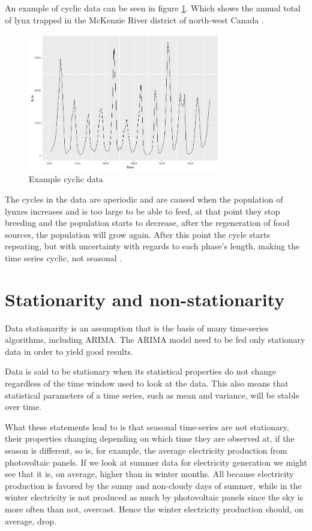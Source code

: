 \documentclass[12pt,a4paper,titlepage]{report}
\begin{document}
An example of cyclic data can be seen in figure \ref{dlynx}. Which shows the annual total of lynx trapped in the McKenzie River district of north-west Canada \cite{fpp2stationarity}.
\begin{figure}[h]
    \centering
    \includegraphics[width=0.75\textwidth]{dlynx}
    \caption{Example cyclic data}
    \label{dlynx}
\end{figure}

The cycles in the data are aperiodic and are caused when the population of lynxes increases and is too large to be able to feed, at that point they stop breeding and the population starts to decrease, after the regeneration of food sources, the population will grow again. After this point the cycle starts repeating, but with uncertainty with regards to each phase's length, making the time series cyclic, not seasonal \cite{fpp2stationarity}.

\section{Stationarity and non-stationarity} \label{stationaritysection}

Data stationarity is an assumption that is the basis of many time-series algorithms, including ARIMA. The ARIMA model need to be fed only stationary data in order to yield good results.

Data is said to be stationary when its statistical properties do not change regardless of the time window used to look at the data. This also means that statistical parameters of a time series, such as mean and variance, will be stable over time. \cite{fpp2stationarity}

What these statements lead to is that seasonal time-series are not stationary, their properties changing depending on which time they are observed at, if the season is different, so is, for example, the average electricity production from photovoltaic panels. If we look at summer data for electricity generation we might see that it is, on average, higher than in winter months. All because electricity production is favored by the sunny and non-cloudy days of summer, while in the winter electricity is not produced as much by photovoltaic panels since the sky is more often than not, overcast. Hence the winter electricity production should, on average, drop.
\end{document}
